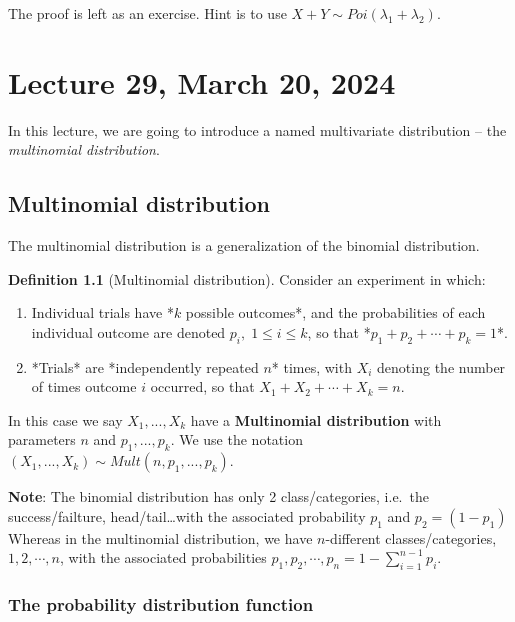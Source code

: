 \documentclass[
]{book}
\theoremstyle{definition}
\newtheorem{definition}{Definition}[chapter]
\theoremstyle{definition}
\theoremstyle{definition}
\theoremstyle{definition}
\theoremstyle{remark}
\begin{document}
The proof is left as an exercise. Hint is to use \(X+Y\sim Poi(\lambda_1+\lambda_2)\).

\chapter{Lecture 29, March 20, 2024}\label{lecture-29-march-20-2024}

\newcommand{\var}{\mathbb{V}ar}
\newcommand{\R}{\mathbb{R}}
\newcommand{\E}{\mathbb{E}}
\newcommand{\N}{\mathcal{N}}

In this lecture, we are going to introduce a named multivariate distribution -- the \emph{multinomial distribution}.

\section{Multinomial distribution}\label{multinomial-distribution}

The multinomial distribution is a generalization of the binomial distribution.

\begin{definition}[Multinomial distribution]
Consider an experiment in which:

\begin{enumerate}
\item Individual trials have *$k$ possible outcomes*, and the probabilities of each individual outcome are denoted $p_i,\;1\le i \le k$, so that *$p_1+p_2+\cdots+p_k=1$*.

\item *Trials* are *independently repeated $n$* times, with $X_i$ denoting the number of times outcome $i$ occurred, so that $X_1+X_2+\cdots+X_k = n$.
\end{enumerate}
\pause

In this case we say \(X_1,...,X_k\) have a \textbf{Multinomial distribution} with parameters \(n\) and \(p_1,...,p_k\). We use the notation \((X_1,...,X_k) \sim Mult(n,p_1,...,p_k)\).
\end{definition}

\textbf{Note}: The binomial distribution has only 2 class/categories, i.e.~the success/failture, head/tail\ldots with the associated probability \(p_1\) and \(p_2=(1-p_1)\) Whereas in the multinomial distribution, we have \(n\)-different classes/categories, \(1,2,\cdots,n\), with the associated probabilities \(p_1,p_2,\cdots,p_n=1-\sum_{i=1}^{n-1}p_i\).

\subsection{The probability distribution function}\label{the-probability-distribution-function}
\end{document}
